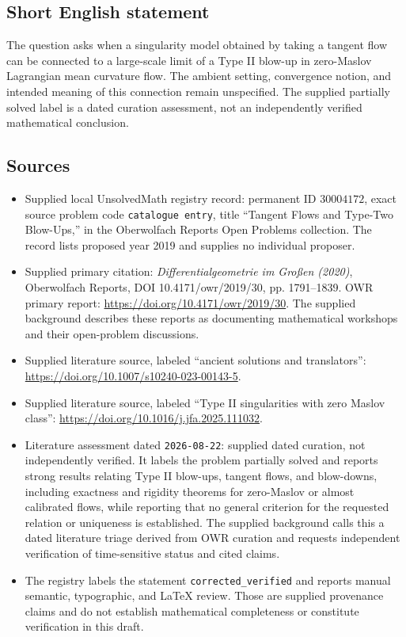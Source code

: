 \documentclass[11pt]{article}
\begin{document}
\subsection{Short English statement}
The question asks when a singularity model obtained by taking a tangent flow can be connected to a large-scale limit of a Type II blow-up in zero-Maslov Lagrangian mean curvature flow. The ambient setting, convergence notion, and intended meaning of this connection remain unspecified. The supplied partially solved label is a dated curation assessment, not an independently verified mathematical conclusion.
\subsection{Sources}
\begin{itemize}
\item Supplied local UnsolvedMath registry record: permanent ID \(30004172\), exact source problem code \texttt{catalogue entry}, title ``Tangent Flows and Type-Two Blow-Ups,'' in the Oberwolfach Reports Open Problems collection. The record lists proposed year 2019 and supplies no individual proposer.
\item Supplied primary citation: \emph{Differentialgeometrie im Großen (2020)}, Oberwolfach Reports, DOI 10.4171/owr/2019/30, pp. 1791--1839. OWR primary report: \url{https://doi.org/10.4171/owr/2019/30}. The supplied background describes these reports as documenting mathematical workshops and their open-problem discussions.
\item Supplied literature source, labeled ``ancient solutions and translators'': \url{https://doi.org/10.1007/s10240-023-00143-5}.
\item Supplied literature source, labeled ``Type II singularities with zero Maslov class'': \url{https://doi.org/10.1016/j.jfa.2025.111032}.
\item Literature assessment dated \texttt{2026-08-22}: supplied dated curation, not independently verified. It labels the problem partially solved and reports strong results relating Type II blow-ups, tangent flows, and blow-downs, including exactness and rigidity theorems for zero-Maslov or almost calibrated flows, while reporting that no general criterion for the requested relation or uniqueness is established. The supplied background calls this a dated literature triage derived from OWR curation and requests independent verification of time-sensitive status and cited claims.
\item The registry labels the statement \texttt{corrected\_verified} and reports manual semantic, typographic, and LaTeX review. Those are supplied provenance claims and do not establish mathematical completeness or constitute verification in this draft.
\end{itemize}
\end{document}
